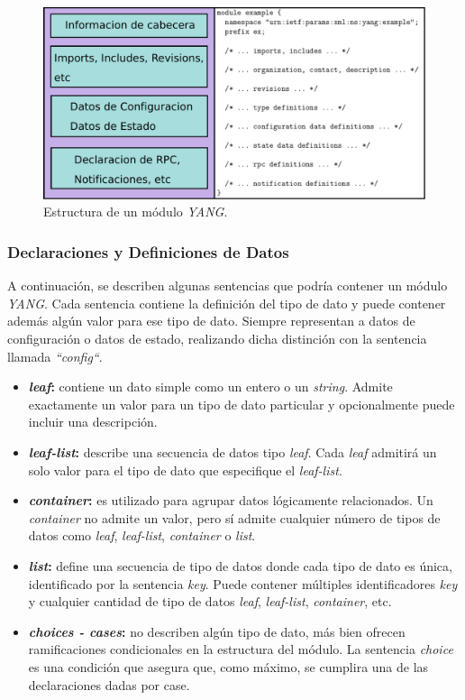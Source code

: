   \begin{figure}[htbp]
	\centering
	\includegraphics[scale=0.4]{Figures/estructura_modulo.pdf}
	\caption{Estructura de un módulo \textit{YANG}.}
	\label{fig:estructura_modulo}
  \end{figure}

  \subsubsection{Declaraciones y Definiciones de Datos}
  A continuación, se describen algunas sentencias que podría contener un módulo \textit{YANG}. Cada sentencia contiene la definición del tipo de dato y puede contener además algún valor para ese tipo de dato. Siempre representan a datos de configuración o datos de estado, realizando dicha distinción con la sentencia llamada \textit{“config“}.  

  \begin{itemize}
	\item \textbf{\textit{leaf}:} contiene un dato simple como un entero o un \textit{string}. Admite exactamente un valor para un tipo de dato particular y opcionalmente puede incluir una descripción. 
	\item \textbf{\textit{leaf-list}:} describe una secuencia de datos tipo \textit{leaf}. Cada \textit{leaf} admitirá un solo valor para el tipo de dato que especifique el \textit{leaf-list}.
	\item \textbf{\textit{container}:} es utilizado para agrupar datos lógicamente relacionados. Un \textit{container} no admite un valor, pero sí admite cualquier número de tipos de datos como \textit{leaf}, \textit{leaf-list}, \textit{container} o \textit{list}.
	\item \textbf{\textit{list}:} define una secuencia de tipo de datos donde cada tipo de dato es única, identificado por la sentencia \textit{key}. Puede contener múltiples identificadores \textit{key} y cualquier cantidad de tipo de datos \textit{leaf}, \textit{leaf-list}, \textit{container}, etc.
	\item \textbf{\textit{choices - cases}:} no describen algún tipo de dato, más bien ofrecen ramificaciones condicionales en la estructura del módulo. La sentencia \textit{choice} es una condición que asegura que, como máximo, se cumplira una de las declaraciones dadas por case.
\end{itemize}

